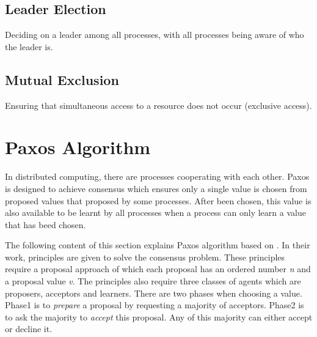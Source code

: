 \documentclass[12pt, a4paper]{article}
\begin{document}
\subsection{Leader Election}

Deciding on a leader among all processes, with all processes being aware of
who the leader is.

\subsection{Mutual Exclusion}

Ensuring that simultaneous access to a resource does not occur (exclusive
access).


\section{Paxos Algorithm} \label{sec:paxos}
In distributed computing, there are processes cooperating with each other. 
Paxos is designed to achieve consensus which ensures 
only a single value is chosen from proposed values that 
proposed by some processes\cite{fischer1983consensus}. 
After been chosen, this value is also available to be learnt by all processes
when a process can only learn a value that has beed chosen. 

The following content of this section explains 
Paxos algorithm based on \cite{fischer1983consensus}. 
In their work, principles are given to solve the consensus problem. 
These principles require a proposal approach 
of which each proposal has an ordered number \textit{n} 
and a proposal value \textit{v}. 
The principles also require three classes of agents 
which are proposers, acceptors and learners. 
There are two phases when choosing a value.
Phase1 is to \textit{prepare} a proposal by requesting a majority of acceptors. 
Phase2 is to ask the majority to \textit{accept} this proposal.
Any of this majority can either accept or decline it.
\end{document}
